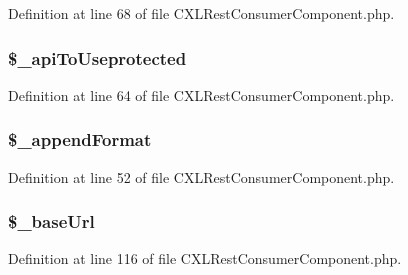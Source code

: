 Definition at line 68 of file CXLRestConsumerComponent.php.

\hypertarget{classCXLRestConsumerComponent_abdfb5848bea7acb66e39972358f344a8}{
\subsubsection[{\$\_\-apiToUseprotected}]{\setlength{\rightskip}{0pt plus 5cm}\$\_\-apiToUseprotected}}
\label{classCXLRestConsumerComponent_abdfb5848bea7acb66e39972358f344a8}


Definition at line 64 of file CXLRestConsumerComponent.php.

\hypertarget{classCXLRestConsumerComponent_ae027f791b6a2fc198dfabc3e2693f585}{
\subsubsection[{\$\_\-appendFormat}]{\setlength{\rightskip}{0pt plus 5cm}\$\_\-appendFormat}}
\label{classCXLRestConsumerComponent_ae027f791b6a2fc198dfabc3e2693f585}


Definition at line 52 of file CXLRestConsumerComponent.php.

\hypertarget{classCXLRestConsumerComponent_ae5c686cdf8e6a089b6296dcb659f6d01}{
\subsubsection[{\$\_\-baseUrl}]{\setlength{\rightskip}{0pt plus 5cm}\$\_\-baseUrl}}
\label{classCXLRestConsumerComponent_ae5c686cdf8e6a089b6296dcb659f6d01}


Definition at line 116 of file CXLRestConsumerComponent.php.

